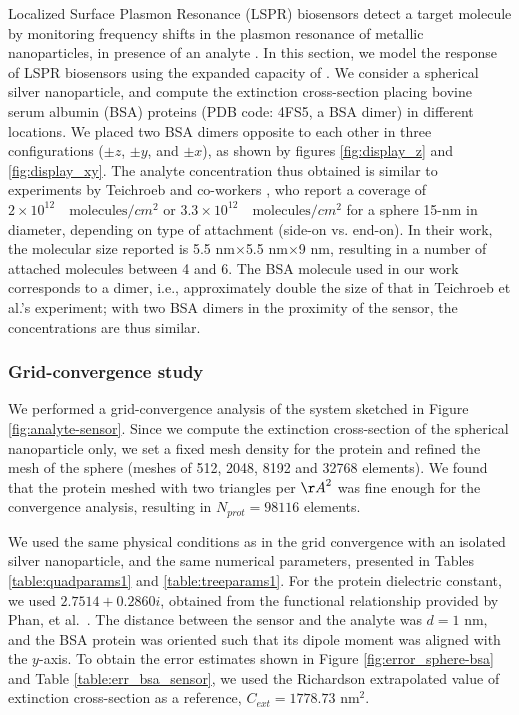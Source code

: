 Localized Surface Plasmon Resonance (LSPR) biosensors detect a target molecule by monitoring
frequency shifts in the plasmon resonance of metallic nanoparticles, in presence of an analyte \cite{WilletsVandyune2007}.
In this section, we model the response of LSPR biosensors using the expanded capacity of \pygbe.
We consider a spherical silver nanoparticle, and compute the extinction cross-section placing 
bovine serum albumin (BSA) proteins (PDB code: 4FS5, a BSA dimer) in different locations.
We placed two BSA dimers opposite to each other in three configurations ($\pm z$, $\pm y$, and $\pm x$), as shown by figures \ref{fig:display_z} and \ref{fig:display_xy}.
The analyte concentration thus obtained is similar to experiments by Teichroeb 
and co-workers \cite{TeichroebETal2008}, who report a coverage of $2\times 10^{12} \quad \text{molecules}/cm^2$  
or $3.3\times 10^{12} \quad \text{molecules}/cm^2$ for a sphere 15-nm in diameter, depending 
on type of attachment (side-on vs. end-on). In their work, the molecular size 
reported is 5.5 nm$\times$5.5 nm$\times$9 nm, resulting in a number of attached molecules  
between 4 and 6. The BSA molecule used in our work corresponds to a dimer, i.e., 
approximately double the size of that in Teichroeb et al.'s experiment; with 
two BSA dimers in the proximity of the sensor, the concentrations are thus similar. 

\subsubsection{Grid-convergence study} \label{sec:bsa_convergence}
We performed a grid-convergence 
analysis of the system sketched in Figure \ref{fig:analyte-sensor}. 
Since we compute the extinction cross-section of the spherical nanoparticle only, we 
set a fixed mesh density for the protein and refined the mesh of the
sphere (meshes of 512, 2048, 8192 and 32768 elements). We found that the protein meshed with two
triangles per ${\AA}^2$ was fine enough for the convergence analysis, resulting in $N_{prot} = 98116$ elements. 

We used the same physical conditions as in the grid convergence with an isolated silver nanoparticle, and the same numerical parameters, presented in Tables \ref{table:quadparams1} and \ref{table:treeparams1}.
For the protein dielectric constant, we used $2.7514 + 0.2860i$, obtained from the 
functional relationship provided by Phan, et al.~\cite{PhanETal2013}.
The distance between the sensor and the analyte was $d=1$ nm, 
and the BSA protein was oriented such that its dipole moment was aligned with the $y$-axis. 
To obtain the error estimates shown in Figure \ref{fig:error_sphere-bsa} and Table \ref{table:err_bsa_sensor},
we used the Richardson extrapolated value of extinction cross-section as a reference, 
$C_{ext}= 1778.73$ nm$^2$.


